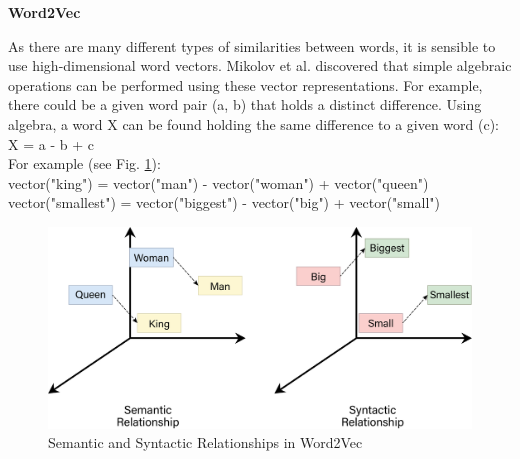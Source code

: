 





\textbf{Word2Vec} \cite{mikolov2013efficient}  

As there are many different types of similarities between words, it is sensible to use high-dimensional word vectors. Mikolov et al. discovered that simple algebraic operations can be performed using these vector representations. For example, there could be a given word pair (a, b) that holds a distinct difference. Using algebra, a word X can be found holding the same difference to a given word (c): \\

X = a - b + c \\

For example (see Fig. \ref{fig:word2vec}): \\
vector("king") = vector("man") - vector("woman") + vector("queen") \\
vector("smallest") = vector("biggest") - vector("big") + vector("small") \\

\begin{figure}[H]
    \centering
    \includegraphics[width=0.6\linewidth]{images/word2vec.png}
    \caption{Semantic and Syntactic Relationships in Word2Vec}
    \label{fig:word2vec}
\end{figure}

